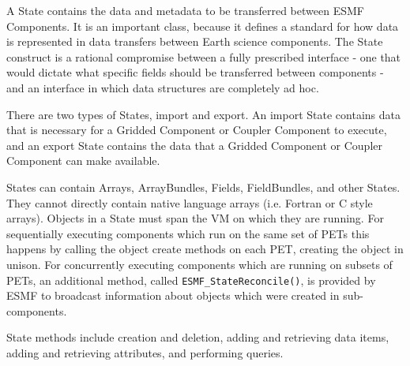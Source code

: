%


\label{sec:State}

A State contains the data and metadata to be transferred between 
ESMF Components.  It is an important class, because it defines a 
standard for how data is represented in data transfers between Earth
science components.  The 
State construct is a rational compromise between a fully prescribed 
interface - one that would dictate what specific fields should be 
transferred between components - and an interface in which data structures
are completely ad hoc.

There are two types of States, import and export.
An import State contains data that is necessary for a Gridded Component
or Coupler Component to execute, and an export State contains the data
that a Gridded Component or Coupler Component can make available.

States can contain Arrays, ArrayBundles, Fields, FieldBundles, 
and other States.  They cannot directly contain native language arrays
(i.e. Fortran or C style arrays).  Objects in a State must span
the VM on which they are running.  For sequentially executing components
which run on the same set of PETs this happens by calling the object
create methods on each PET, creating the object in unison.   For
concurrently executing components which are running on subsets of PETs,
an additional method, called {\tt ESMF\_StateReconcile()}, is provided by
ESMF to broadcast information
about objects which were created in sub-components.

State methods include creation and deletion, adding and retrieving 
data items, adding and retrieving attributes, and performing queries.  


